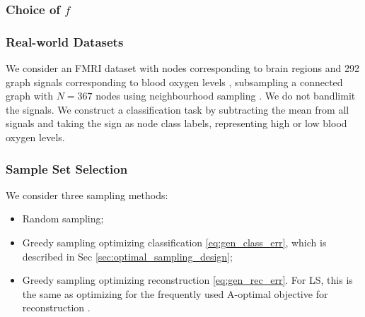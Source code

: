 \subsubsection{Choice of $f$}

\subsubsection{Real-world Datasets}
We consider an FMRI dataset with nodes corresponding to brain regions and 292 graph signals corresponding to blood oxygen levels \cite{zhi2023gaussian, sripathmanathan2024impact}, subsampling a connected graph with $N=367$ nodes using neighbourhood sampling \cite{hamilton2017inductive}. We do not bandlimit the  signals. We construct a classification task by subtracting the mean from all signals and taking the sign as node class labels, representing high or low blood oxygen levels.


\subsubsection{Sample Set Selection}
We consider three sampling methods:
\begin{itemize}
    \item Random sampling;
    \item Greedy sampling optimizing classification  \eqref{eq:gen_class_err}, which is described in Sec \ref{sec:optimal_sampling_design};
    \item Greedy sampling optimizing reconstruction  \eqref{eq:gen_rec_err}. For LS, this is the same as optimizing for the frequently used A-optimal objective for reconstruction \cite{wang2018optimal, wang2019low, sripathmanathan2024impact, mfn}.
\end{itemize}

